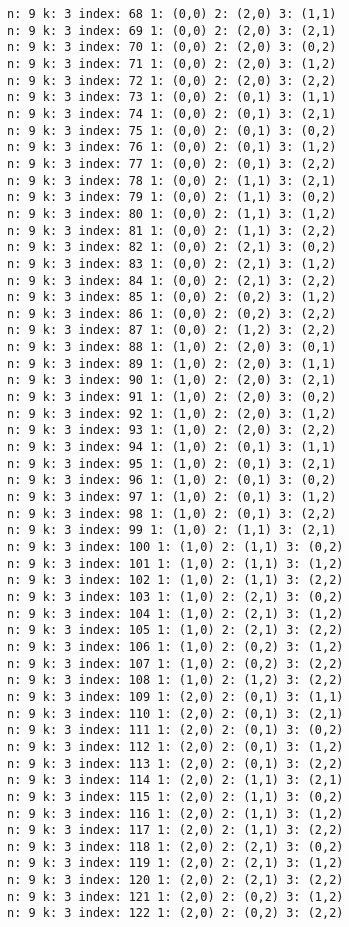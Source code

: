 \documentclass[a4paper]{article}
\theoremstyle{definition}
\begin{document}
\begin{lstlisting}[breaklines]
n: 9 k: 3 index: 68 1: (0,0) 2: (2,0) 3: (1,1)
n: 9 k: 3 index: 69 1: (0,0) 2: (2,0) 3: (2,1)
n: 9 k: 3 index: 70 1: (0,0) 2: (2,0) 3: (0,2)
n: 9 k: 3 index: 71 1: (0,0) 2: (2,0) 3: (1,2)
n: 9 k: 3 index: 72 1: (0,0) 2: (2,0) 3: (2,2)
n: 9 k: 3 index: 73 1: (0,0) 2: (0,1) 3: (1,1)
n: 9 k: 3 index: 74 1: (0,0) 2: (0,1) 3: (2,1)
n: 9 k: 3 index: 75 1: (0,0) 2: (0,1) 3: (0,2)
n: 9 k: 3 index: 76 1: (0,0) 2: (0,1) 3: (1,2)
n: 9 k: 3 index: 77 1: (0,0) 2: (0,1) 3: (2,2)
n: 9 k: 3 index: 78 1: (0,0) 2: (1,1) 3: (2,1)
n: 9 k: 3 index: 79 1: (0,0) 2: (1,1) 3: (0,2)
n: 9 k: 3 index: 80 1: (0,0) 2: (1,1) 3: (1,2)
n: 9 k: 3 index: 81 1: (0,0) 2: (1,1) 3: (2,2)
n: 9 k: 3 index: 82 1: (0,0) 2: (2,1) 3: (0,2)
n: 9 k: 3 index: 83 1: (0,0) 2: (2,1) 3: (1,2)
n: 9 k: 3 index: 84 1: (0,0) 2: (2,1) 3: (2,2)
n: 9 k: 3 index: 85 1: (0,0) 2: (0,2) 3: (1,2)
n: 9 k: 3 index: 86 1: (0,0) 2: (0,2) 3: (2,2)
n: 9 k: 3 index: 87 1: (0,0) 2: (1,2) 3: (2,2)
n: 9 k: 3 index: 88 1: (1,0) 2: (2,0) 3: (0,1)
n: 9 k: 3 index: 89 1: (1,0) 2: (2,0) 3: (1,1)
n: 9 k: 3 index: 90 1: (1,0) 2: (2,0) 3: (2,1)
n: 9 k: 3 index: 91 1: (1,0) 2: (2,0) 3: (0,2)
n: 9 k: 3 index: 92 1: (1,0) 2: (2,0) 3: (1,2)
n: 9 k: 3 index: 93 1: (1,0) 2: (2,0) 3: (2,2)
n: 9 k: 3 index: 94 1: (1,0) 2: (0,1) 3: (1,1)
n: 9 k: 3 index: 95 1: (1,0) 2: (0,1) 3: (2,1)
n: 9 k: 3 index: 96 1: (1,0) 2: (0,1) 3: (0,2)
n: 9 k: 3 index: 97 1: (1,0) 2: (0,1) 3: (1,2)
n: 9 k: 3 index: 98 1: (1,0) 2: (0,1) 3: (2,2)
n: 9 k: 3 index: 99 1: (1,0) 2: (1,1) 3: (2,1)
n: 9 k: 3 index: 100 1: (1,0) 2: (1,1) 3: (0,2)
n: 9 k: 3 index: 101 1: (1,0) 2: (1,1) 3: (1,2)
n: 9 k: 3 index: 102 1: (1,0) 2: (1,1) 3: (2,2)
n: 9 k: 3 index: 103 1: (1,0) 2: (2,1) 3: (0,2)
n: 9 k: 3 index: 104 1: (1,0) 2: (2,1) 3: (1,2)
n: 9 k: 3 index: 105 1: (1,0) 2: (2,1) 3: (2,2)
n: 9 k: 3 index: 106 1: (1,0) 2: (0,2) 3: (1,2)
n: 9 k: 3 index: 107 1: (1,0) 2: (0,2) 3: (2,2)
n: 9 k: 3 index: 108 1: (1,0) 2: (1,2) 3: (2,2)
n: 9 k: 3 index: 109 1: (2,0) 2: (0,1) 3: (1,1)
n: 9 k: 3 index: 110 1: (2,0) 2: (0,1) 3: (2,1)
n: 9 k: 3 index: 111 1: (2,0) 2: (0,1) 3: (0,2)
n: 9 k: 3 index: 112 1: (2,0) 2: (0,1) 3: (1,2)
n: 9 k: 3 index: 113 1: (2,0) 2: (0,1) 3: (2,2)
n: 9 k: 3 index: 114 1: (2,0) 2: (1,1) 3: (2,1)
n: 9 k: 3 index: 115 1: (2,0) 2: (1,1) 3: (0,2)
n: 9 k: 3 index: 116 1: (2,0) 2: (1,1) 3: (1,2)
n: 9 k: 3 index: 117 1: (2,0) 2: (1,1) 3: (2,2)
n: 9 k: 3 index: 118 1: (2,0) 2: (2,1) 3: (0,2)
n: 9 k: 3 index: 119 1: (2,0) 2: (2,1) 3: (1,2)
n: 9 k: 3 index: 120 1: (2,0) 2: (2,1) 3: (2,2)
n: 9 k: 3 index: 121 1: (2,0) 2: (0,2) 3: (1,2)
n: 9 k: 3 index: 122 1: (2,0) 2: (0,2) 3: (2,2)

\end{lstlisting}
\end{document}
